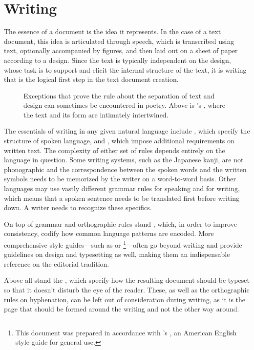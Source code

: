 \chapter{Writing}
The essence of a document is the idea it represents. In the case of a text
document, this idea is articulated through speech, which is transcribed using
text, optionally accompanied by figures, and then laid out on a sheet of paper
according to a design. Since the text is typically independent on the design,
whose task is to support and elicit the internal structure of the text, it is
writing that is the logical first step in the text document creation.

\begin{figure}
  
  \caption{Exceptions that prove the rule about the separation of text and
    design can sometimes be encountered in poetry. Above is 's , where the text and its
    form are intimately intertwined.}
\end{figure}

The essentials of writing in any given natural language include , which specify the structure of spoken
language, and , which
impose additional requirements on written text. The complexity of either set of
rules depends entirely on the language in question. Some writing systems, such
as the Japanese kanji, are not phonographic and the correspondence between
the spoken words and the written symbols needs to be memorized by the writer on
a word-to-word basis. Other languages may use vastly different grammar rules for
speaking and for writing, which means that a spoken sentence needs to be
translated first before writing down. A writer needs to recognize these
specifics.

On top of grammar and orthographic rules stand , which, in
order to improve consistency, codify how common language patterns are encoded.
More comprehensive style guides---such as  or
\footnote{
  This document was prepared in accordance with 's
  , an American English style guide for general use. 
}---often go beyond writing and provide guidelines on design and typesetting as
well, making them an indispensable reference on the editorial tradition.

Above all stand the ,
which specify how the resulting document should be typeset so that it doesn't
disturb the eye of the reader. These, as well as the orthographic rules on
hyphenation, can be left out of consideration during writing, as it is the page
that should be formed around the writing and not the other way around.

